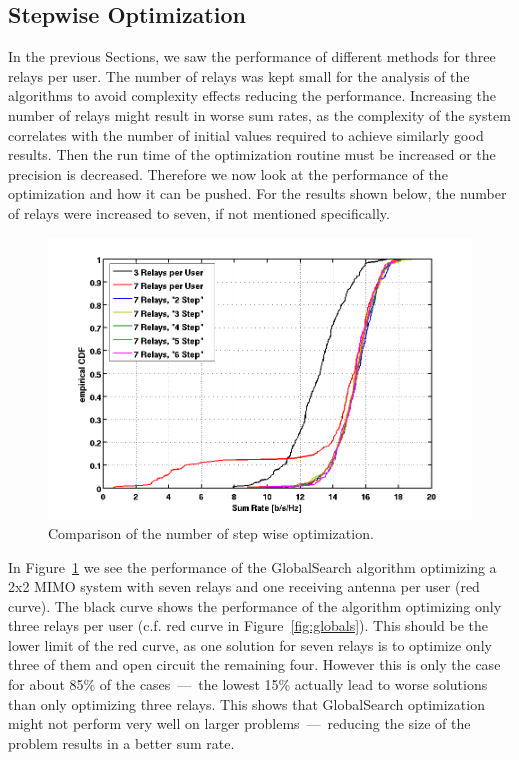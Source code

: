 \subsection{Stepwise Optimization}
\label{sec:stepwise}
In the previous Sections, we saw the performance of different methods for three relays per user.
The number of relays was kept small for the analysis of the algorithms to avoid complexity effects reducing the performance.
Increasing the number of relays might result in worse sum rates, as the complexity of the system correlates with the number of initial values required to achieve similarly good results.
Then the run time of the optimization routine must be increased or the precision is decreased.
Therefore we now look at the performance of the optimization and how it can be pushed.
For the results shown below, the number of relays were increased to seven, if not mentioned specifically.
\begin{figure}[h]
\centering
  \includegraphics[width=\linewidth]{images/Relstepcomparison_edited.png}
\caption{Comparison of the number of step wise optimization.}
\label{fig:nrel7}
\end{figure}

In Figure~\ref{fig:nrel7} we see the performance of the GlobalSearch algorithm optimizing a 2x2 MIMO system with seven relays and one receiving antenna per user (red curve).
The black curve shows the performance of the algorithm optimizing only three relays per user (c.f.  red curve in Figure~\ref{fig:globals}).
This should be the lower limit of the red curve, as one solution for seven relays is to optimize only three of them and open circuit the remaining four.
However this is only the case for about 85\% of the cases~---~the lowest 15\% actually lead to worse solutions than only optimizing three relays.
This shows that GlobalSearch optimization might not perform very well on larger problems~---~reducing the size of the problem results in a better sum rate.

